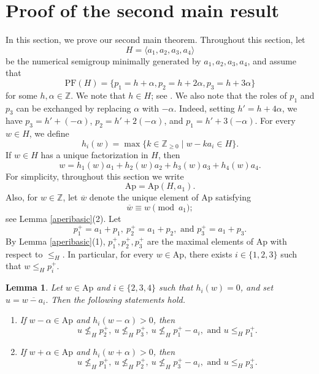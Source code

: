\documentclass[12pt]{amsart}
\numberwithin{equation}{section}
\newtheorem{lemma}[theorem]{Lemma}
\theoremstyle{definition}
\newcommand{\ZZ}{ \ensuremath{\mathbb{Z}}}
\newcommand{\PF}{\mathrm{PF}}
\newcommand{\socle}{\mathrm{socle}}
\newcommand{\Ap}{\mathrm{Ap}}
\begin{document}







\section{Proof of the second main result}

In this section, we prove our second main theorem.
Throughout this section, let
\[
H=\langle a_1,a_2,a_3,a_4\rangle
\]
be the numerical semigroup minimally generated by
$a_1,a_2,a_3,a_4$, and assume that
\[
\PF(H)=\{p_1=h+\alpha,p_2=h+2\alpha,p_3=h+3\alpha\}
\]
for some $h,\alpha\in\mathbb Z$.
We note that $h\in H$; see \cite[Lemma 2]{KM}.
We also note that the roles of $p_1$ and $p_3$ can be exchanged by
replacing $\alpha$ with $-\alpha$.
Indeed, setting $h'=h+4\alpha$, we have
$p_3=h'+(-\alpha)$,
$p_2=h'+2(-\alpha)$,
and $p_1=h'+3(-\alpha)$.
For every $w \in H$, we define
\[
h_i(w)=\max\{k\in\mathbb Z_{\geq0}\mid w-ka_i\in H\}.\]
If $w\in H$ has a unique factorization in $H$, then
\[
w=h_1(w)a_1+h_2(w)a_2+h_3(w)a_3+h_4(w)a_4.
\]
For simplicity, throughout this section we write
\[
\Ap=\Ap(H,a_1).
\]
Also, for $w\in\ZZ$, let $\overline w$ denote the unique element of
$\Ap$ satisfying
\[
\overline w\equiv w\pmod{a_1};
\]
see Lemma \ref{aperibasic}(2).
Let
\[p^+_1=a_1+p_1,\ p^+_2=a_1+p_2, \text{ and } p^+_3=a_1+p_3.\]
By Lemma \ref{aperibasic}(1),
$p_1^+,p_2^+,p_3^+$ are the maximal elements of $\Ap$
with respect to $\leq_H$.
In particular, for every $w\in\Ap$, there exists
$i\in\{1,2,3\}$ such that $w\leq_Hp_i^+$.


\begin{lemma}
    \label{4.1}
Let $w\in\Ap$ and $i\in\{2,3,4\}$ such that $h_i(w)=0$, and set
$u=\overline{w-a_i}.$
Then the following statements hold.
\begin{enumerate}
        \item[(1)] If $w-\alpha \in \Ap$ and $h_i(w-\alpha)>0$, then 
\[
u\not\leq_Hp_2^+,\
u\not\leq_Hp_3^+,\
u\not\leq_Hp_1^+-a_i,
\text{ and }
u\leq_Hp_1^+.
\]        
\item[(2)]
If $w+\alpha\in\Ap$ and $h_i(w+\alpha)>0$, then
\[
u\not\leq_Hp_1^+,\
u\not\leq_Hp_2^+,\
u\not\leq_Hp_3^+-a_i,
\text{ and }
u\leq_Hp_3^+.
\]
\end{enumerate}
\end{lemma}
\end{document}
